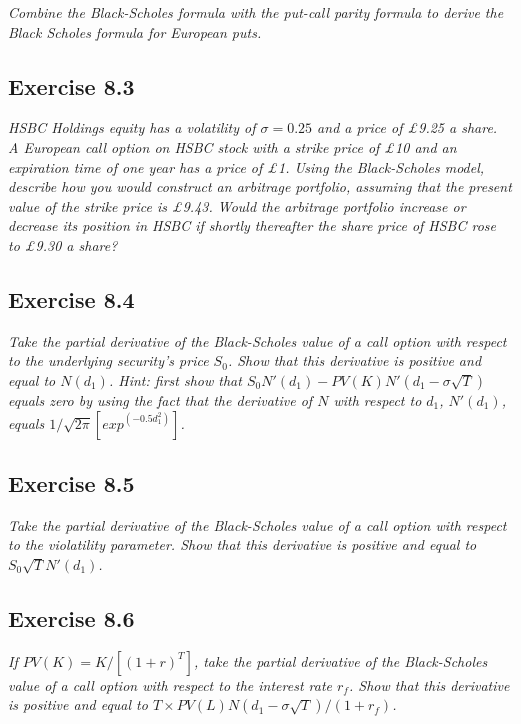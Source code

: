 \documentclass[]{book}
\theoremstyle{definition}
\theoremstyle{definition}
\theoremstyle{remark}
\begin{document}
\emph{Combine the Black-Scholes formula with the put-call parity formula
to derive the Black Scholes formula for European puts.}
\citep[p.271]{book}

\subsection{Exercise 8.3}\label{exercise-8.3}

\emph{HSBC Holdings equity has a volatility of \(\sigma=0.25\) and a
price of £9.25 a share. A European call option on HSBC stock with a
strike price of £10 and an expiration time of one year has a price of
£1. Using the Black-Scholes model, describe how you would construct an
arbitrage portfolio, assuming that the present value of the strike price
is £9.43. Would the arbitrage portfolio increase or decrease its
position in HSBC if shortly thereafter the share price of HSBC rose to
£9.30 a share?} \citep[p.271]{book}

\subsection{Exercise 8.4}\label{exercise-8.4}

\emph{Take the partial derivative of the Black-Scholes value of a call
option with respect to the underlying security's price \(S_0\). Show
that this derivative is positive and equal to \(N\left(d_1\right)\).
Hint: first show that
\(S_0N'\left(d_1\right)-PV\left(K\right)N'\left(d_1-\sigma\sqrt{T}\right)\)
equals zero by using the fact that the derivative of \(N\) with respect
to \(d_1\), \(N'\left(d_1\right)\), equals
\(1/\sqrt{2\pi}\left[exp^{\left(-0.5d_1^2\right)}\right]\).}
\citep[p.271]{book}

\subsection{Exercise 8.5}\label{exercise-8.5}

\emph{Take the partial derivative of the Black-Scholes value of a call
option with respect to the violatility parameter. Show that this
derivative is positive and equal to \(S_0\sqrt{T}N'\left(d_1\right)\).}
\citep[p.271]{book}

\subsection{Exercise 8.6}\label{exercise-8.6}

\emph{If \(PV\left(K\right)=K/\left[\left(1+r\right)^T\right]\), take
the partial derivative of the Black-Scholes value of a call option with
respect to the interest rate \(r_f\). Show that this derivative is
positive and equal to
\(T\times PV\left(L\right)N\left(d_1-\sigma\sqrt{T}\right)/\left(1+r_f\right)\).}
\citep[p.271]{book}
\end{document}
